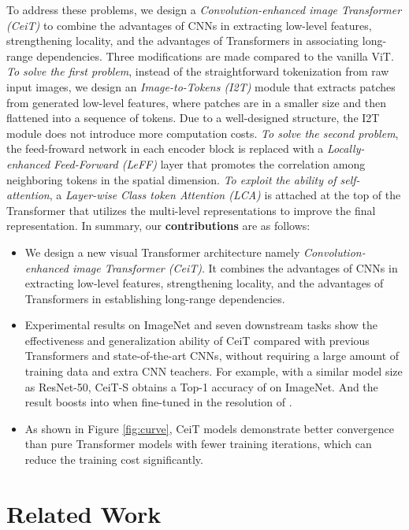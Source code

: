 \documentclass[10pt,twocolumn,letterpaper]{article}
\begin{document}
To address these problems, we design a {\textit{Convolution-enhanced image Transformer (CeiT)}} to combine the advantages of CNNs in extracting low-level features, strengthening locality, and the advantages of Transformers in associating long-range dependencies. Three modifications are made compared to the vanilla ViT. \textit{To solve the first problem}, instead of the straightforward tokenization from raw input images, we design an \textit{{Image-to-Tokens (I2T)}} module that extracts patches from generated low-level features, where patches are in a smaller size and then flattened into a sequence of tokens. Due to a well-designed structure, the I2T module does not introduce more computation costs. \textit{To solve the second problem}, the feed-froward network in each encoder block is replaced with a \textit{{Locally-enhanced Feed-Forward (LeFF)}} layer that promotes the correlation among neighboring tokens in the spatial dimension. \textit{To exploit the ability of self-attention}, a \textit{{Layer-wise Class token Attention (LCA)}} is attached at the top of the Transformer that utilizes the multi-level representations to improve the final representation.
In summary, our \textbf{contributions} are as follows:
\begin{itemize}
    \item {We design a new visual Transformer architecture namely \textit{Convolution-enhanced image Transformer (CeiT)}. It combines the advantages of CNNs in extracting low-level features,  strengthening locality, and the advantages of Transformers in establishing long-range dependencies.}
    \item{Experimental results on ImageNet and seven downstream tasks show the effectiveness and generalization ability of CeiT compared with previous Transformers and state-of-the-art CNNs, without requiring a large amount of training data and extra CNN teachers. For example, with a similar model size as ResNet-50, CeiT-S obtains a Top-1 accuracy of  on ImageNet. And the result boosts into  when fine-tuned in the resolution of .}
    \item As shown in Figure \ref{fig:curve}, CeiT models demonstrate better convergence than pure Transformer models with  fewer training iterations, which can reduce the training cost significantly.
\end{itemize}



\section{Related Work}
\end{document}
